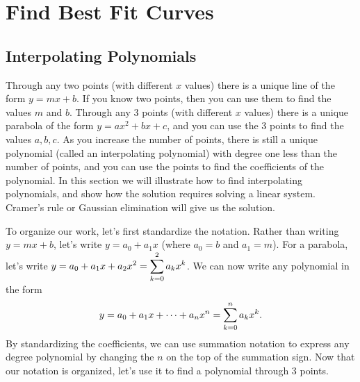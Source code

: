 \section{Find Best Fit Curves}
\subsection{Interpolating Polynomials}
Through any two points (with different $x$ values) there is a unique line of the form $y=mx+b$. If you know two points, then you can use them to find the values $m$ and $b$.  Through any 3 points (with different $x$ values) there is a unique parabola of the form $y=ax^2+bx+c$, and you can use the 3 points to find the values $a,b,c$.  As you increase the number of points, there is still a unique polynomial (called an interpolating polynomial) with degree one less than the number of points, and you can use the points to find the coefficients of the polynomial. In this section we will illustrate how to find interpolating polynomials, and show how the solution requires solving a linear system. Cramer's rule or Gaussian elimination will give us the solution. 

To organize our work, let's first standardize the notation.  Rather than writing $y=mx+b$, let's write $y=a_0+a_1 x$ (where $a_0=b$ and $a_1=m$). For a parabola, let's write $\displaystyle y=a_0 + a_1 x+ a_2 x^2 = \sum_{k=0}^{2} a_k x^k$. We can now write any polynomial in the form $$\displaystyle y = a_0 + a_1 x+ \cdots + a_n x^n = \sum_{k=0}^n a_k x^k.$$ By standardizing the coefficients, we can use summation notation to express any degree polynomial by changing the $n$ on the top of the summation sign. Now that our notation is organized, let's use it to find a polynomial through 3 points.

